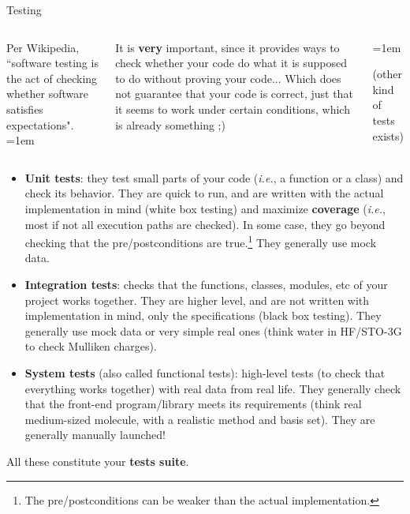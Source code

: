 \documentclass[10pt,
aspectratio=169
]{beamer}
\begin{document}
\begin{frame}{Testing}
	\begin{columns}
		
		Per Wikipedia, ``software testing is the act of checking whether software satisfies expectations". 
		\parskip=1em
		
		It is \textbf{very} important, since it provides ways to check whether your code do what it is supposed to do without proving your code... Which does not guarantee that your code is correct, just that it seems to work under certain conditions, which is already something ;)
		
	
	\begin{center}
		\parskip=1em
		
		(other kind of tests exists)
	\end{center}
\end{columns}
\end{frame}

\begin{frame}
	\begin{itemize}
		\item \textbf{Unit tests}: they test small parts of your code (\textit{i.e.}, a function or a class) and check its behavior. They are quick to run, and are written with the actual implementation in mind (white box testing) and maximize \textbf{coverage} (\textit{i.e.}, most if not all execution paths are checked). In some case, they go beyond checking that the pre/postconditions are true.\footnote{The pre/postconditions can be weaker than the actual implementation.} They generally use mock data.
		\item \textbf{Integration tests}: checks that the functions, classes, modules, etc of your project works together. They are higher level, and are not written with implementation in mind, only the specifications (black box testing). They generally use mock data or very simple real ones (think water in HF/STO-3G to check Mulliken charges).
		\item \textbf{System tests} (also called functional tests): high-level tests (to check that everything works together) with real data from real life. They generally check that the front-end program/library meets its requirements (think real medium-sized molecule, with a realistic method and basis set). They are generally manually launched!
	\end{itemize}
	All these constitute your \textbf{tests suite}.
\end{frame}
\end{document}
